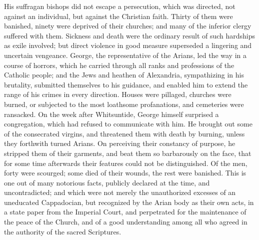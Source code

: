 His suffragan bishops did not escape a persecution, which was
directed, not against an individual, but against the Christian faith.
Thirty of them were banished, ninety were deprived of their churches;
and many of the inferior clergy suffered with them. Sickness and
death were the ordinary result of such hardships as exile involved;
but direct violence in good measure superseded a lingering and
uncertain vengeance. George, the representative of the Arians, led the
way in a course of horrors, which he carried through all ranks and
professions of the Catholic people; and the Jews and heathen of
Alexandria, sympathizing in his brutality, submitted themselves to his
guidance, and enabled him to extend the range of his crimes in every
direction. Houses were pillaged, churches were burned, or subjected to
the most loathsome profanations, and cemeteries were ransacked. On the
week after Whitsuntide, George himself surprised a congregation, which
had refused to communicate with him. He brought out some of the
consecrated virgins, and threatened them with death by burning, unless
they forthwith turned Arians. On perceiving their constancy of
purpose, he stripped them of their garments, and beat them so
barbarously on the face, that for some time afterwards their features
could not be distinguished. Of the men, forty were scourged; some died
of their wounds, the rest were banished. This is one out of many
notorious facts, publicly declared at the time, and uncontradicted;
and which were not merely the unauthorized excesses of an uneducated
Cappadocian, but recognized by the Arian body as their own acts, in a
state paper from the Imperial Court, and perpetrated for the
maintenance of the peace of the Church, and of a good understanding
among all who agreed in the authority of the sacred Scriptures.

